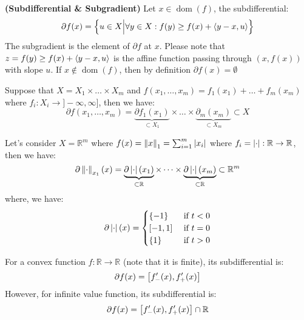 \begin{definition}{\textbf{(Subdifferential \& Subgradient)}}
    Let $x\in\operatorname{dom}(f)$, the subdifferential:
    \begin{equation*}
        \partial f(x) = \left\{  u\in X \Big| \forall y \in X : f(y)\ge f(x) + \left\langle y-x, u \right\rangle  \right\}
    \end{equation*}
    The subgradient is the element of $\partial f$ at $x$. Please note that $z = f(y)\ge f(x) + \left\langle y-x, u \right\rangle$ is the affine function passing through $(x, f(x))$ with slope $u$. If $x\not\in\operatorname{dom}(f)$, then by definition $\partial f(x)=\emptyset$
\end{definition}

\begin{lemma}
    Suppose that $X = X_1\times\dots\times X_m$ and $f(x_1,\dots,x_m) = f_1(x_1) + \dots + f_m(x_m)$ where $f_i:X_i\rightarrow]-\infty,\infty]$, then we have:
    \begin{equation*}
        \partial f(x_1,\dots,x_m) = \underbrace{\partial f_1(x_1)}_{\subset X_1} \times\dots\times \underbrace{\partial_m(x_m)}_{\subset X_m} \subset X
    \end{equation*}
\end{lemma}

\begin{remark}
    Let's consider $X = \mathbb{R}^m$ where $f(x) = \left\lVert x\right\rVert_1 = \sum^m_{i=1}\left| x_i \right|$ where $f_i=\left| \cdot \right|:\mathbb{R}\rightarrow \mathbb{R}$, then we have:
    \begin{equation*}
        \partial\left\lVert\cdot\right\rVert_{x_1}(x) = \underbrace{\partial\left| \cdot \right|(x_1)}_{\subset \mathbb{R}}\times\dots\times\underbrace{\partial\left| \cdot \right|(x_m)}_{\subset \mathbb{R}}\subset \mathbb{R}^m
    \end{equation*}
    where, we have:
    \begin{equation*}
        \partial\left| \cdot \right|(x) = \begin{cases}
            \{-1\} &\text{ if } t < 0 \\
            [-1, 1] &\text{ if } t = 0 \\
            \left\{ 1 \right\} &\text{ if } t>0
        \end{cases}
    \end{equation*}
\end{remark}

\begin{lemma}
    For a convex function $f:\mathbb{R}\rightarrow \mathbb{R}$ (note that it is finite), its subdifferential is:
    \begin{equation*}
        \partial f(x) = \left[ f_-'(x), f_+'(x) \right]
    \end{equation*}
    However, for infinite value function, its subdifferential is:
    \begin{equation*}
        \partial f(x) = \left[ f_-'(x), f_+'(x) \right]\cap \mathbb{R}
    \end{equation*}
\end{lemma}

